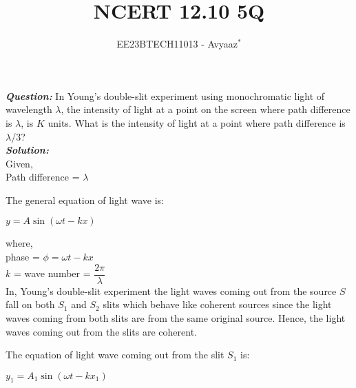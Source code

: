 \documentclass[journal,12pt,twocolumn]{IEEEtran}
\theoremstyle{remark}
\begin{document}

\vspace{3cm}

\title{NCERT 12.10 5Q}
\author{EE23BTECH11013 - Avyaaz$^{*}$%
}
\maketitle
\newpage
\bigskip

\renewcommand{\thefigure}{\theenumi}
\renewcommand{\thetable}{\theenumi}

\large\textbf{\textsl{Question:}}
In Young’s double-slit experiment using monochromatic light of wavelength $\lambda$, the intensity of light at a point on the screen where path difference is $\lambda$, is $K$ units. What is the intensity of light at a
point where path difference is $\lambda$/3?\\
\large\textbf{\textsl{Solution:}}\\
Given,\\
\hspace*{1cm}Path difference = $\lambda$

The general equation of light wave is:

\vspace{0.2cm}

  \hspace*{1.3cm}  $y = A\sin{(\omega t - kx)}$

\vspace{0.3cm}

 where,\\
 \hspace*{1.5cm} phase = $\phi = \omega t - kx$ \\
 \hspace*{1.5cm} $k$ = wave number = $\dfrac{2\pi}{\lambda}$ \\
In, Young's double-slit experiment the light waves coming out from the source $S$ fall on both $S_1$ and $S_2$ slits which behave like coherent sources since the light waves coming from both slits are from the same original source. Hence, the light waves coming out from the slits are coherent.

\vspace{0.3cm}

The equation of light wave coming out from the slit $S_1$ is:

\vspace{0.2cm}

 \hspace*{1.3cm}  $y_1 = A_1\sin{(\omega t - kx_1)}$
\end{document}
